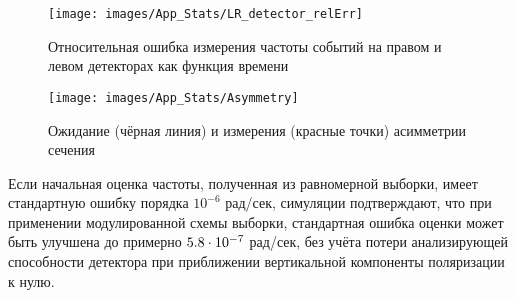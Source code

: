 \begin{figure}[H]
	\centering
	\texttt{[image: images/App\_Stats/LR\_detector\_relErr]}
	\caption{Относительная ошибка измерения частоты событий на правом и левом
		детекторах как функция времени\label{fig:LRDetErr}}
\end{figure}

\begin{figure}[H]
	\centering
	\texttt{[image: images/App\_Stats/Asymmetry]}
	\caption{Ожидание (чёрная линия) и измерения (красные точки)
		асимметрии сечения\label{fig:Asym}}
\end{figure}

Если начальная оценка частоты, полученная из равномерной выборки, 
имеет стандартную ошибку порядка $10^{-6}$ рад/сек, симуляции
подтверждают, что при применении модулированной схемы выборки, 
стандартная ошибка оценки может быть улучшена до примерно ${5.8}\cdot 10^{-7}$ рад/сек, 
без учёта потери анализирующей способности детектора
при приближении вертикальной компоненты поляризации к нулю.

